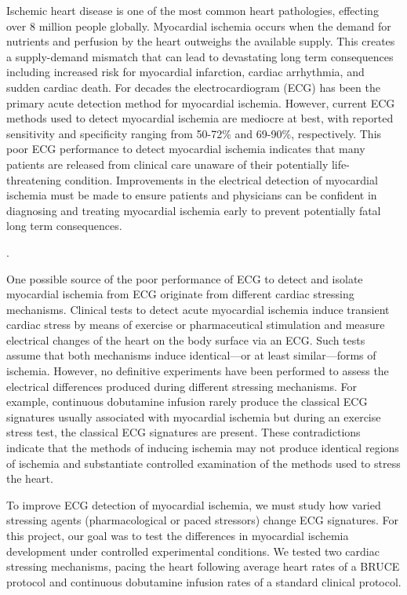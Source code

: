 \documentclass[twocolumn]{cinc}
\begin{document}
Ischemic heart disease is one of the most common heart pathologies, effecting over 8 million people globally. \cite{Roth2015} Myocardial ischemia occurs when the demand for nutrients and perfusion by the heart outweighs the available supply. This creates a supply-demand mismatch that can lead to devastating long term consequences including increased risk for myocardial infarction, cardiac arrhythmia, and sudden cardiac death.\cite{Roth2015} For decades the electrocardiogram (ECG) has been the primary acute detection method for myocardial ischemia. \cite{McCarthy1990} However, current ECG methods used to detect myocardial ischemia are mediocre at best, with reported sensitivity and specificity ranging from 50-72\% and 69-90\%, respectively. \cite{Akkerhuis2011} This poor ECG performance to detect myocardial ischemia indicates that many patients are released from clinical care unaware of their potentially life-threatening condition. Improvements in the electrical detection of myocardial ischemia must be made to ensure patients and physicians can be confident in diagnosing and treating myocardial ischemia early to prevent potentially fatal long term consequences. 

.    


One possible source of the poor performance of ECG to detect and isolate myocardial ischemia from ECG originate from different cardiac stressing mechanisms. Clinical tests to detect acute myocardial ischemia induce transient cardiac stress by means of exercise or pharmaceutical stimulation and measure electrical changes of the heart on the body surface via an  ECG. Such tests  assume that both mechanisms induce identical—or at least similar—forms of ischemia. However, no definitive experiments have been performed to assess the electrical differences produced during different stressing mechanisms. For example, continuous dobutamine infusion rarely produce the classical ECG signatures usually associated with myocardial ischemia but during an exercise stress test, the classical ECG signatures are present. These contradictions indicate that the methods of inducing ischemia may not produce identical regions of ischemia and substantiate controlled examination of the methods used to stress the heart. 

To improve ECG detection of myocardial ischemia, we must study how varied stressing agents (pharmacological or paced stressors) change ECG signatures. For this project, our goal was to test the differences in myocardial ischemia development under controlled experimental conditions. We tested two cardiac stressing mechanisms, pacing the heart following average heart rates of a BRUCE protocol and continuous dobutamine infusion rates of a standard clinical protocol. 
\end{document}
